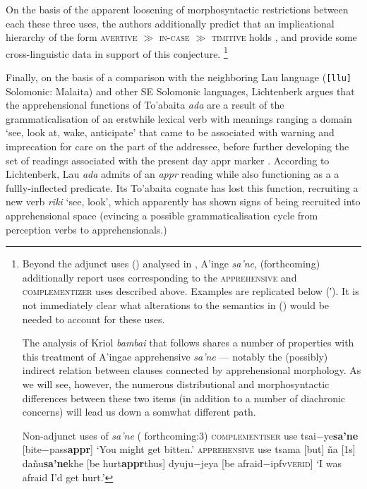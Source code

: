  On the basis of the apparent loosening of morphosyntactic restrictions between each these three uses, the authors additionally predict that an implicational hierarchy of the form \textsc{avertive $\gg$ in-case $ \gg $ timitive} holds \citeyearpar[386-87]{AnderBois2020}, and provide some cross-linguistic data in support of this conjecture.
\footnote{Beyond the adjunct uses () analysed in \citealt{AnderBois2020}, A'inge \textit{\textdblhyphen sa'ne}, \citet{Dabkowski} (forthcoming) additionally report uses corresponding to the \textsc{apprehensive} and \textsc{complementizer} uses described above. Examples are replicated below (′). It is not immediately clear what alterations to the semantics in () would be needed to account for these uses.
	
The analysis of Kriol \textit{bambai} that follows shares a number of properties with this treatment of A'ingae apprehensive \textdblhyphen\textit{sa'ne} --- notably the (possibly) indirect relation between clauses connected by apprehensional morphology. As we will see, however, the numerous distributional and morphosyntactic differences between these two items (in addition to a number of diachronic concerns) will lead us down a somwhat different path.

\pex[glstyle=nlevel,aboveglftskip=.2ex,belowglpreambleskip=0ex,belowexskip=0ex,aboveexskip=1ex,exno=\getref{con}′] Non-adjunct uses of \textit{\textdblhyphen sa'ne} (\citealp{Dabkowski} forthcoming:3)
\a[label=d]\begingl\glpreamble\textsc{complementiser} use \endpreamble
tsai−ye\textdblhyphen\textbf{sa’ne} [bite−pass\textdblhyphen\textbf{\gls{appr}}]
\glft`You might get bitten.'
\endgl
\a[label=e]\begingl\glpreamble \textsc{apprehensive} use \endpreamble
tsama [but]
ña [1s]
dañu\textdblhyphen\textbf{sa'ne}\textdblhyphen khe [be hurt\textdblhyphen\textbf{\gls{appr}}\textdblhyphen thus]
dyuju−je\textdblhyphen ya [be afraid−\gls{ipfv}\textdblhyphen\textsc{verid}]
\glft`I was afraid I'd get hurt.'%
\endgl
\xe}



Finally, on the basis of a comparison with the neighboring Lau language (\texttt{[llu]} Solomonic: Malaita) and other SE Solomonic languages, Lichtenberk argues that the apprehensional functions of To'abaita \textit{ada} are a result of the grammaticalisation of an erstwhile lexical verb with meanings ranging a domain `see, look at, wake, anticipate' that came to be associated with warning and imprecation for care on the part of the addressee, before further developing the set of readings associated with the present day {\sc appr} marker \citeyearpar[303-4]{Lichtenberk1995}. According to Lichtenberk, Lau \textit{ada} admits of an \textsl{appr} reading while also functioning as a a fullly-inflected predicate. Its To'abaita cognate has lost this function, recruiting a new verb \textit{riki} `see, look', which apparently has shown signs of being recruited into apprehensional space (evincing a possible grammaticalisation cycle from perception verbs to apprehensionals.)




